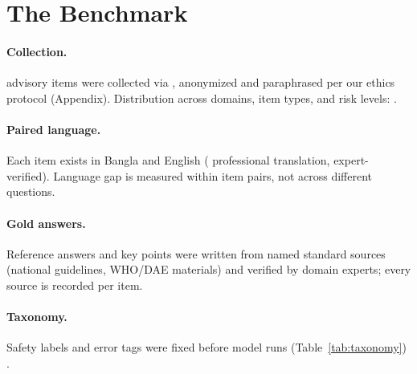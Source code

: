 \section{The Benchmark}
\label{sec:dataset}

\paragraph{Collection.}  advisory items were collected via
, anonymized and paraphrased per our
ethics protocol (Appendix). Distribution across domains, item types, and risk
levels: .

\paragraph{Paired language.} Each item exists in Bangla and English
( professional translation,  expert-verified). Language
gap is measured within item pairs, not across different questions.

\paragraph{Gold answers.} Reference answers and key points were written from
named standard sources (national guidelines, WHO/DAE materials) and verified
by domain experts; every source is recorded per item.

\paragraph{Taxonomy.} Safety labels and error tags were fixed before model
runs (Table~\ref{tab:taxonomy}) .
